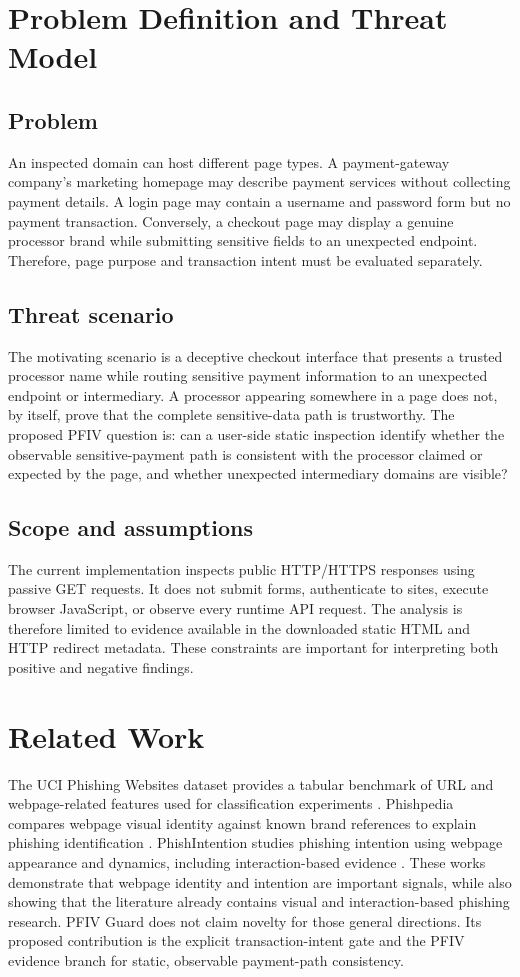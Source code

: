 \documentclass[conference]{IEEEtran}
\begin{document}
\section{Problem Definition and Threat Model}
\subsection{Problem}
An inspected domain can host different page types. A payment-gateway company's marketing homepage may describe payment services without collecting payment details. A login page may contain a username and password form but no payment transaction. Conversely, a checkout page may display a genuine processor brand while submitting sensitive fields to an unexpected endpoint. Therefore, page purpose and transaction intent must be evaluated separately.

\subsection{Threat scenario}
The motivating scenario is a deceptive checkout interface that presents a trusted processor name while routing sensitive payment information to an unexpected endpoint or intermediary. A processor appearing somewhere in a page does not, by itself, prove that the complete sensitive-data path is trustworthy. The proposed PFIV question is: can a user-side static inspection identify whether the observable sensitive-payment path is consistent with the processor claimed or expected by the page, and whether unexpected intermediary domains are visible?

\subsection{Scope and assumptions}
The current implementation inspects public HTTP/HTTPS responses using passive GET requests. It does not submit forms, authenticate to sites, execute browser JavaScript, or observe every runtime API request. The analysis is therefore limited to evidence available in the downloaded static HTML and HTTP redirect metadata. These constraints are important for interpreting both positive and negative findings.

\section{Related Work}
The UCI Phishing Websites dataset provides a tabular benchmark of URL and webpage-related features used for classification experiments \cite{uci}. Phishpedia compares webpage visual identity against known brand references to explain phishing identification \cite{phishpedia}. PhishIntention studies phishing intention using webpage appearance and dynamics, including interaction-based evidence \cite{phishintention}. These works demonstrate that webpage identity and intention are important signals, while also showing that the literature already contains visual and interaction-based phishing research. PFIV Guard does not claim novelty for those general directions. Its proposed contribution is the explicit transaction-intent gate and the PFIV evidence branch for static, observable payment-path consistency.
\end{document}
